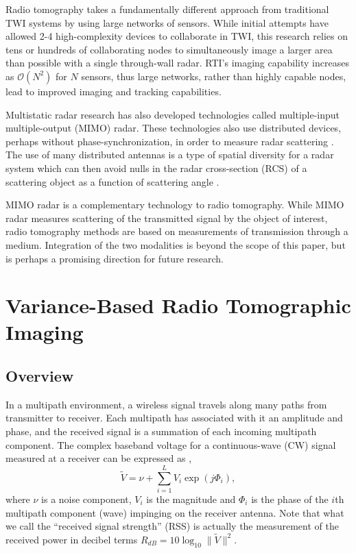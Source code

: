 \documentclass[journal]{IEEEtran}
\newcommand{\Order}[1]{\mathcal{O}\left( {#1} \right)}
\begin{document}
Radio tomography takes a fundamentally different approach from traditional TWI systems by using large networks of sensors. While initial attempts \cite{Hunt05} have allowed 2-4 high-complexity devices to collaborate in TWI, this research relies on tens or hundreds of collaborating nodes to simultaneously image a larger area than possible with a single through-wall radar.  RTI's imaging capability increases as $\Order{N^2}$ for $N$ sensors, thus large networks, rather than highly capable nodes, lead to improved imaging and tracking capabilities.

Multistatic radar research has also developed technologies called multiple-input multiple-output (MIMO) radar. These technologies also use distributed devices, perhaps without phase-synchronization, in order to measure radar scattering \cite{Haimovich08}.  The use of many distributed antennas is a type of spatial diversity for a radar system which can then avoid nulls in the radar cross-section (RCS) of a scattering object as a function of scattering angle \cite{Fishler06}.

MIMO radar is a complementary technology to radio tomography.  While MIMO radar measures scattering of the transmitted signal by the object of interest, radio tomography methods are based on measurements of transmission through a medium. Integration of the two modalities is beyond the scope of this paper, but is perhaps a promising direction for future research.

\section{Variance-Based Radio Tomographic Imaging} \label{section.VRTI}

\subsection{Overview}

In a multipath environment, a wireless signal travels along many paths from transmitter to receiver. Each multipath has associated with it an amplitude and phase, and the received signal is a summation of each incoming multipath component. The complex baseband voltage for a continuous-wave (CW) signal measured at a receiver can be expressed as \cite{durgin02},
\begin{equation}\label{eq.voltageReceiver}
 \tilde{V} = \nu + \sum_{i=1}^L V_i \exp\left( j\Phi_i\right),
\end{equation}
where $\nu$ is a noise component, $V_i$ is the magnitude and $\Phi_i$ is the phase of the $i$th multipath component (wave) impinging on the receiver antenna. Note that what we call the ``received signal strength'' (RSS) is actually the measurement of the received power in decibel terms $R_{dB} = 10 \log_{10} \| \tilde{V}\|^2$.
\end{document}
